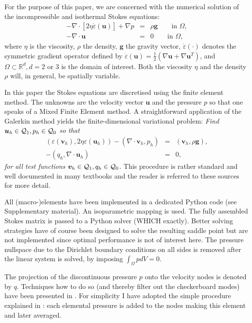 \documentclass[a4paper]{article}
\begin{document}
For the purpose of this paper, we are concerned with the numerical solution of 
the incompressible and isothermal Stokes equations:
\begin{eqnarray}
-\nabla \cdot \left[ 2\eta \dot\varepsilon({\bm u}) \right] + \nabla p &=& \rho \bm g \qquad  \textrm{in $\Omega$},
\label{eq:conv_momentum}  \\  
-\nabla \cdot {\bm u} &=& 0    \qquad    \textrm{in $\Omega$},   \label{eq:conv_mass} 
\end{eqnarray}
where $\eta$ is the viscosity, $\rho$ the density, ${\bm g}$ the gravity vector, $\dot\varepsilon(\cdot)$
denotes the symmetric gradient operator defined by $\dot\varepsilon({\bm u})
=\frac 12 (\nabla {\bm u} + \nabla {\bm u}^{T})$, 
and $\Omega\subset{\mathbb R}^d, d=2\text{ or }3$ is the domain
of interest. Both the viscosity $\eta$
and the density $\rho$ will, in general, be spatially variable.

In this paper the Stokes equations are discretised using the finite element method.
The unknowns are the velocity vector ${\bm u}$ and the pressure $p$ so that 
one speaks of a Mixed Finite Element method. 
A straightforward application of the Galerkin method yields the finite-dimensional 
variational problem: 
\textit{Find ${\bm u}_h\in {\cal Q}_1,p_h\in {\cal Q}_0$
so that
\begin{eqnarray}
\label{eq:discrete-formulation}
\left(\varepsilon(\bm v_h), 2\eta \varepsilon(\bm u_h)\right)  - ( \nabla \cdot \bm v_h, p_h) &=&   ({\bm v}_h,\rho \bm g),\\
-(q_h,\nabla \cdot \bm u_h) &=& 0,
\end{eqnarray}
for all test functions ${\bm v}_h\in {\cal Q}_1, q_h\in {\cal Q}_0$.}
This procedure is rather standard and well documented in many 
textbooks \cite{grsa,dohu03,bobf13} and the reader is referred to these sources 
for more detail.

All (macro-)elements have been implemented in a dedicated Python code (see Supplementary material). 
An isoparametric mapping is used. 
The fully assembled Stokes matrix is passed to a Python solver (WHICH exactly). 
Better solving strategies have of course 
been designed to solve the resulting saddle point \cite{begl05} but are not 
implemented since optimal performance is not of interest here.
The pressure nullspace due to the Dirichlet boundary conditions on all sides is removed 
after the linear system is solved, by imposing $\int_\Omega p dV= 0$.

The projection of the discontinuous pressure $p$ onto the velocity nodes is denoted by $q$. 
Techniques how to do so (and thereby filter out the checkerboard modes) have been presented in 
\cite{chpc95,legs79}.
For simplicity I have adopted the simple procedure explained in \cite{REF}: each 
elemental pressure is added to the nodes making this element and later averaged. 
\end{document}
